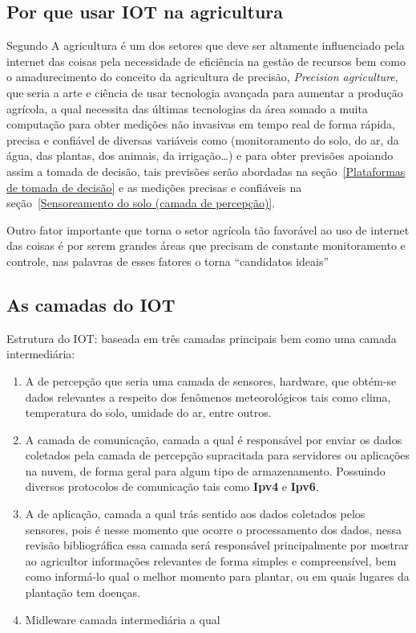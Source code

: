 \documentclass[
article,			%
12pt,				%
oneside,			%
a4paper,			%
english,			%
brazil,				%
sumario=tradicional
]{abntex2}
\begin{document}
\subsection{Por que usar IOT na agricultura}\label{Por que usar IOT na agricultura}
Segundo \citeauthor{5} A agricultura é um dos setores que deve ser altamente influenciado pela internet das coisas pela necessidade de eficiência na gestão de recursos bem como o amadurecimento do conceito da agricultura de precisão, \textit{Precision agriculture}\cite{PrecisionAg}, que seria a arte e ciência de usar tecnologia avançada para aumentar a produção agrícola\cite{9}, a qual necessita das últimas tecnologias da área somado a muita computação para obter medições não invasivas em tempo real de forma rápida, precisa e confiável de diversas variáveis como (monitoramento do solo, do ar, da água, das plantas, dos animais, da irrigação\ldots)\cite{10} e para obter previsões apoiando assim a tomada de decisão, tais previsões serão abordadas na seção~\ref{Plataformas de tomada de decisão} e as medições precisas e confiáveis na seção~\ref{Sensoreamento do solo (camada de percepção)}.

Outro fator importante que torna o setor agrícola tão favorável ao uso de internet das coisas é por serem grandes áreas que precisam de constante monitoramento e controle, nas palavras de \citeauthor{10} esses fatores o torna ``candidatos ideais''

\subsection{As camadas do IOT}\label{As camadas do IOT}

  Estrutura do IOT: baseada em três camadas\cite{5} principais bem como uma camada intermediária:
    \begin{enumerate}
      \item A de percepção que seria uma camada de sensores, hardware, que obtém-se dados relevantes a respeito dos fenômenos meteorológicos tais como clima, temperatura do solo, umidade do ar, entre outros.
      \item A camada de comunicação, camada a qual é responsável por enviar os dados coletados pela camada de percepção supracitada para servidores ou aplicações na nuvem, de forma geral para algum tipo de armazenamento. Possuindo diversos protocolos de comunicação tais como \textbf{Ipv4} e \textbf{Ipv6}\cite{camada2}.
      \item A de aplicação, camada a qual trás sentido aos dados coletados pelos sensores, pois é nesse momento que ocorre o processamento dos dados, nessa revisão bibliográfica essa camada será responsável principalmente por mostrar ao agricultor informações relevantes de forma simples e compreensível, bem como informá-lo qual o melhor momento para plantar\cite{1}, ou em quais lugares da plantação tem doenças\cite{2}.
      \item Midleware camada intermediária a qual
    \end{enumerate}
\end{document}
